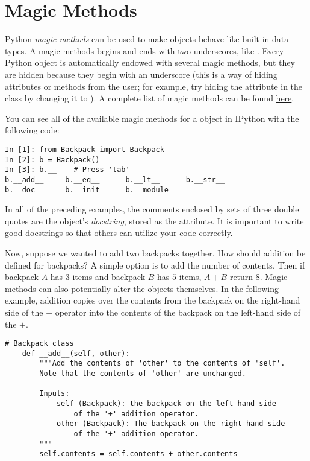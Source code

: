\section*{Magic Methods}

Python \emph{magic methods} can be used to make objects behave like built-in data types.
A magic methods begins and ends with two underscores, like .
Every Python object is automatically endowed with several magic methods, but they are hidden because they begin with an underscore (this is a way of hiding attributes or methods from the user; for example, try hiding the  attribute in the  class by changing it to ).
A complete list of magic methods can be found \href{https://docs.python.org/2/reference/datamodel.html#special-method-names}{here}.

You can see all of the available magic methods for a  object in IPython with the following code:

\begin{lstlisting}
In [1]: from Backpack import Backpack
In [2]: b = Backpack()
In [3]: b.__	# Press 'tab'
b.__add__     b.__eq__      b.__lt__      b.__str__     
b.__doc__     b.__init__    b.__module__  
\end{lstlisting}

\begin{info}
In all of the preceding examples, the comments enclosed by sets of three double quotes are the object's \emph{docstring}, stored as the  attribute.
It is important to write good docstrings so that others can utilize your code correctly.
\end{info}

Now, suppose we wanted to add two backpacks together.
How should addition be defined for backpacks?
A simple option is to add the number of contents.
Then if backpack $A$ has $3$ items and backpack $B$ has $5$ items, $A + B$ return $8$.
Magic methods can also potentially alter the objects themselves.
In the following example, addition copies over the contents from the backpack on the right-hand side of the $+$ operator into the contents of the backpack on the left-hand side of the $+$.

\begin{lstlisting}
# Backpack class
    def __add__(self, other):
        """Add the contents of 'other' to the contents of 'self'.
        Note that the contents of 'other' are unchanged.
        
        Inputs:
            self (Backpack): the backpack on the left-hand side
                of the '+' addition operator.
            other (Backpack): The backpack on the right-hand side
                of the '+' addition operator.
        """
        self.contents = self.contents + other.contents
\end{lstlisting}

